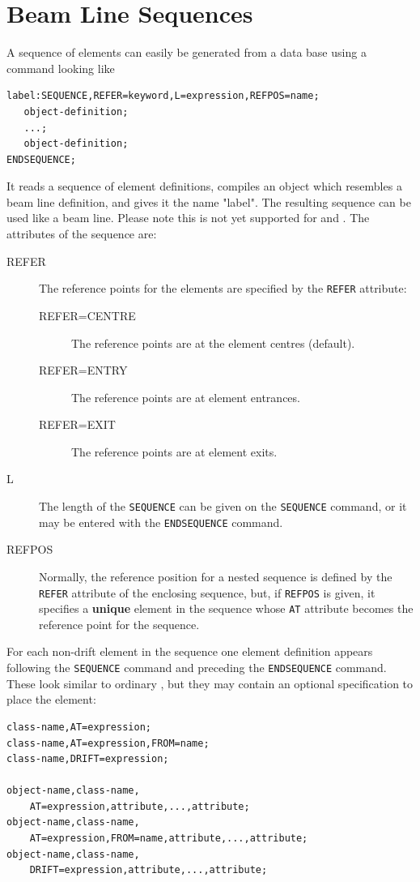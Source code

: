 \section{Beam Line Sequences}
\label{sec:sequence}
A sequence of elements can easily be generated from a data base
using a command looking like
\begin{verbatim}
label:SEQUENCE,REFER=keyword,L=expression,REFPOS=name;
   object-definition;
   ...;
   object-definition;
ENDSEQUENCE;
\end{verbatim}
It reads a sequence of element definitions,
compiles an object which resembles a beam line definition,
and gives it the name "label".
The resulting sequence can be used like a beam line.
Please note this is not yet supported for \noopalt and \noopalcycl .
The attributes of the sequence are:
\begin{description}
\item[REFER]
  The reference points for the elements are specified by the \texttt{REFER} 
  attribute:
  \begin{description}
  \item[REFER=CENTRE]
    The reference points are at the element centres (default).
  \item[REFER=ENTRY]
    The reference points are at element entrances.
  \item[REFER=EXIT]
    The reference points are at element exits.
  \end{description}
\item[L]
  The length of the \texttt{SEQUENCE} can be given on the 
  \texttt{SEQUENCE} command,
  or it may be entered with the \texttt{ENDSEQUENCE} command.
\item[REFPOS]
  Normally, the reference position for a nested sequence is defined by
  the \texttt{REFER} attribute of the enclosing sequence,
  but, if \texttt{REFPOS} is given, it specifies a \textbf{unique}
  element in the sequence whose \texttt{AT} attribute becomes the 
  reference point for the sequence.
\end{description}
For each non-drift element in the sequence one element definition appears
following the \texttt{SEQUENCE} command and preceding the
\texttt{ENDSEQUENCE} command. 
These look similar to ordinary ,
but they may contain an optional specification to place the element:
\begin{verbatim}
class-name,AT=expression;
class-name,AT=expression,FROM=name;
class-name,DRIFT=expression;

object-name,class-name,
	AT=expression,attribute,...,attribute;
object-name,class-name,
	AT=expression,FROM=name,attribute,...,attribute;
object-name,class-name,
	DRIFT=expression,attribute,...,attribute;
\end{verbatim}
